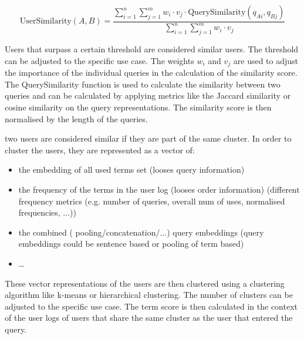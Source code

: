 \[
\text{UserSimilarity}(A, B) = \frac{\sum_{i=1}^n \sum_{j=1}^m w_i \cdot v_j \cdot \text{QuerySimilarity}(q_{Ai}, q_{Bj})}{\sum_{i=1}^n \sum_{j=1}^m w_i \cdot v_j}
\]

Users that surpass a certain threshold are considered similar users. The threshold can be adjusted to the specific use case. 
The weights $w_i$ and $v_j$ are used to adjust the importance of the individual queries in the calculation of the similarity score. 
The QuerySimilarity function is used to calculate the similarity between two queries and can be calculated by applying metrics like the Jaccard similarity or cosine similarity on the query representations.
The similarity score is then normalised by the length of the queries.


two users are considered similar if they are part of the same cluster. In order to cluster the users, they are represented as a vector of:
\begin{itemize}
    \item the embedding of all used terms set (looses query information)
    \item the frequency of the terms in the user log (looses order information) (different frequency metrics (e.g. number of queries, overall num of uses, normalised frequencies, ...))
    \item the combined ( pooling/concatenation/...) query embeddings (query embeddings could be sentence based or pooling of term based)
    \item \dots
\end{itemize}

These vector representations of the users are then clustered using a clustering algorithm like k-means or hierarchical clustering. 
The number of clusters can be adjusted to the specific use case.
The term score is then calculated in the context of the user logs of users that share the same cluster as the user that entered the query. 

